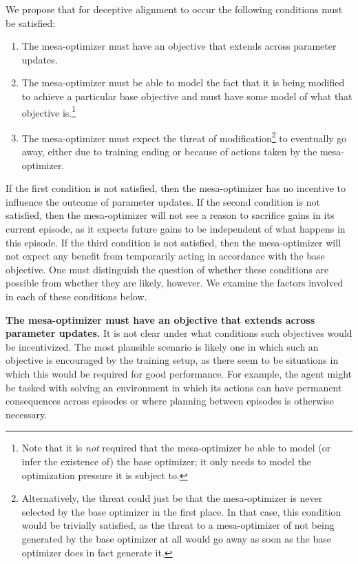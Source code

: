 \documentclass[
  onecolumn,
  natbib,
]{miri-tech-article}
\begin{document}
We propose that for deceptive alignment to occur the following conditions must be satisfied:
\begin{enumerate}
\item The mesa-optimizer must have an objective that extends across parameter updates.
\item The mesa-optimizer must be able to model the fact that it is being modified to achieve a particular base objective and must have some model of what that objective is.\footnote{Note that it is \textit{not} required that the mesa-optimizer be able to model (or infer the existence of) the base optimizer; it only needs to model the optimization pressure it is subject to. }
\item The mesa-optimizer must expect the threat of modification\footnote{Alternatively, the threat could just be that the mesa-optimizer is never selected by the base optimizer in the first place. In that case, this condition would be trivially satisfied, as the threat to a mesa-optimizer of not being generated by the base optimizer at all would go away as soon as the base optimizer does in fact generate it.} to eventually go away, either due to training ending or because of actions taken by the mesa-optimizer.
\end{enumerate}
If the first condition is not satisfied, then the mesa-optimizer has no incentive to influence the outcome of parameter updates. If the second condition is not satisfied, then the mesa-optimizer will not see a reason to sacrifice gains in its current episode, as it expects future gains to be independent of what happens in this episode. If the third condition is not satisfied, then the mesa-optimizer will not expect any benefit from temporarily acting in accordance with the base objective. One must distinguish the question of whether these conditions are possible from whether they are likely, however. We examine the factors involved in each of these conditions below.

\textbf{The mesa-optimizer must have an objective that extends across parameter updates.} It is not clear under what conditions such objectives would be incentivized. The most plausible scenario is likely one in which such an objective is encouraged by the training setup, as there seem to be situations in which this would be required for good performance. For example, the agent might be tasked with solving an environment in which its actions can have permanent consequences across episodes or where planning between episodes is otherwise necessary.
\end{document}
